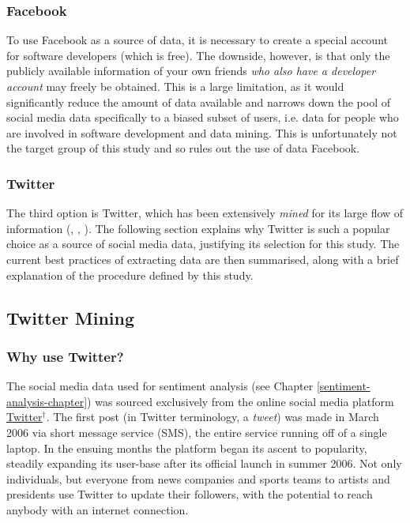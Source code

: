 \documentclass{article}
\begin{document}
\subsubsection{Facebook}
\label{sec-3-1-2}

To use Facebook as a source of data, it is necessary to create a special account for software developers (which is free). The downside, however, is that only the publicly available information of your own friends \emph{who also have a developer account} may freely be obtained. This is a large limitation, as it would significantly reduce the amount of data available and narrows down the pool of social media data specifically to a biased subset of users, i.e. data for people who are involved in software development and data mining. This is unfortunately not the target group of this study and so rules out the use of data Facebook.


\subsubsection{Twitter}
\label{sec-3-1-3}
The third option is Twitter, which has been extensively \emph{mined} for its large flow of information (\cite{pak2010twitterMiningEx1}, \cite{bian2012towardsMiningEx2}, \cite{ediger2010massiveMiningEx3}). The following section explains why Twitter is such a popular choice as a source of social media data, justifying its selection for this study. The current best practices of extracting data are then summarised, along with a brief explanation of the procedure defined by this study.

\pagebreak

\subsection{Twitter Mining}
\label{sec-3-2}


\subsubsection{Why use Twitter?}
\label{sec-3-2-1}

The social media data used for sentiment analysis (see Chapter \ref{sentiment-analysis-chapter}) was sourced exclusively from the online social media platform \href{https://twitter.com/}{Twitter$^{\dag{}}$}. The first post (in Twitter terminology, a \emph{tweet}) was made in March 2006 via short message service (SMS), the entire service running off of a single laptop. In the ensuing months the platform began its ascent to popularity, steadily expanding its user-base after its official launch in summer 2006. Not only individuals, but everyone from news companies and sports teams to artists and presidents use Twitter to update their followers, with the potential to reach anybody with an internet connection.
\end{document}
